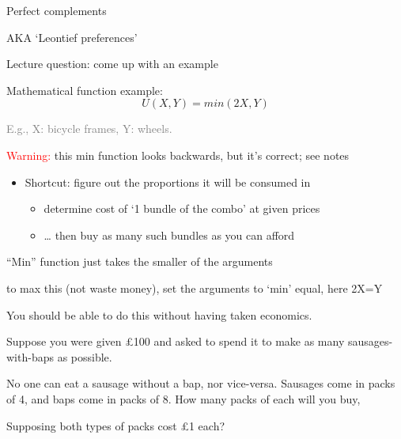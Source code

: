 \documentclass[table]{beamer}
\providecommand{\tightlist}{%
  \setlength{\itemsep}{0pt}\setlength{\parskip}{0pt}}
\begin{document}
\begin{frame}

\begin{block}{Perfect complements}

AKA `Leontief preferences'

Lecture question: come up with an example

Mathematical function example:\\

\[U(X,Y)=min(2X,Y)\]

\textcolor{gray}{E.g., X: bicycle frames, Y: wheels.}

\bigskip

\textcolor{red}{Warning:} this min function looks backwards, but it's
correct; see notes

\begin{itemize}
\tightlist
\item
  Shortcut: figure out the proportions it will be consumed in

  \begin{itemize}
  \tightlist
  \item
    determine cost of `1 bundle of the combo' at given prices
  \item
    \ldots{} then buy as many such bundles as you can afford
  \end{itemize}
\end{itemize}

``Min'' function just takes the smaller of the arguments

to max this (not waste money), set the arguments to `min' equal, here
2X=Y

You should be able to do this without having taken economics.

Suppose you were given \pounds100 and asked to spend it to make as many
sausages-with-baps as possible.

No one can eat a sausage without a bap, nor vice-versa. Sausages come in
packs of 4, and baps come in packs of 8. How many packs of each will you
buy,

Supposing both types of packs cost \pounds1 each?

\end{block}

\end{frame}
\end{document}

